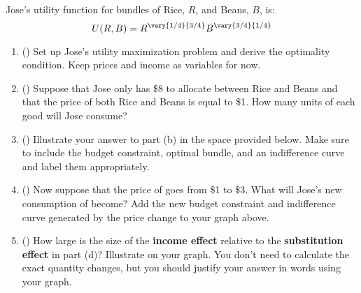 \begin{question}[type=exam]{25}
  Jose's utility function for bundles of Rice, $R$, and Beans, $B$, is:
  $$ U(R,B) = R^{\vary{1/4}{3/4}} B^{\vary{3/4}{1/4}} $$

  \begin{enumerate}[label=\alph*)]

    \item ()
      Set up Jose's utility maximization problem and derive the optimality condition.
      Keep prices and income as variables for now.
    \vspace{8cm}

    \item ()
      Suppose that Jose only has \$8 to allocate between Rice and Beans
      and that the price of both Rice and Beans is equal to \$1.
      How many units of each good will Jose consume?

    \newpage

    \item ()
      Illustrate your answer to part (b) in the space provided below.
      Make sure to include the budget constraint, optimal bundle, and an indifference curve and label them appropriately.

      \begin{center}
      \end{center}

    \item ()
      Now suppose that the price of  goes from \$1 to \$3.
      What will Jose's new consumption of  become?
      Add the new budget constraint and indifference curve generated by the price change to your graph above.
    \vspace{3cm}

    \item ()
      How large is the size of the \textbf{income effect} relative to the \textbf{substitution effect} in part (d)?
      Illustrate on your graph.
      You don't need to calculate the exact quantity changes, but you should justify your answer in words using your graph.
    \vspace{3cm}

  \end{enumerate}

\end{question}
